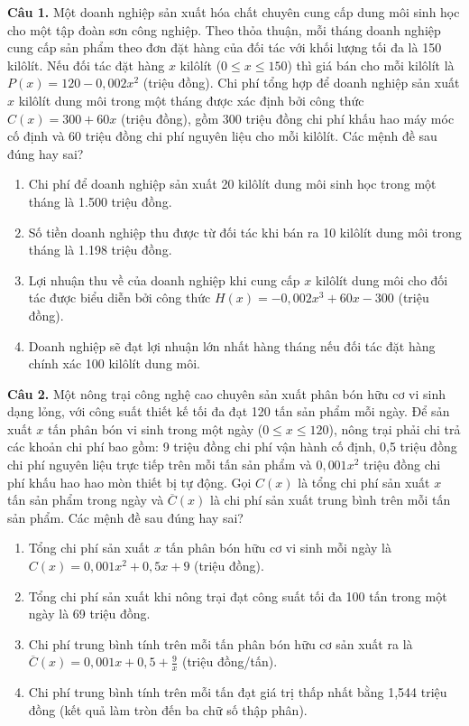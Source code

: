 \documentclass[12pt]{article}
\begin{document}
	\noindent \textbf{Câu 1.} Một doanh nghiệp sản xuất hóa chất chuyên cung cấp dung môi sinh học cho một tập đoàn sơn công nghiệp. Theo thỏa thuận, mỗi tháng doanh nghiệp cung cấp sản phẩm theo đơn đặt hàng của đối tác với khối lượng tối đa là 150 kilôlít. Nếu đối tác đặt hàng $x$ kilôlít ($0 \le x \le 150$) thì giá bán cho mỗi kilôlít là $P(x) = 120 - 0,002x^2$ (triệu đồng). Chi phí tổng hợp để doanh nghiệp sản xuất $x$ kilôlít dung môi trong một tháng được xác định bởi công thức $C(x) = 300 + 60x$ (triệu đồng), gồm 300 triệu đồng chi phí khấu hao máy móc cố định và 60 triệu đồng chi phí nguyên liệu cho mỗi kilôlít. Các mệnh đề sau đúng hay sai?
	\begin{enumerate}[label=\textbf{\alph*)}]
		\item Chi phí để doanh nghiệp sản xuất 20 kilôlít dung môi sinh học trong một tháng là 1.500 triệu đồng. \hfill  
		\item Số tiền doanh nghiệp thu được từ đối tác khi bán ra 10 kilôlít dung môi trong tháng là 1.198 triệu đồng. \hfill  
		\item Lợi nhuận thu về của doanh nghiệp khi cung cấp $x$ kilôlít dung môi cho đối tác được biểu diễn bởi công thức $H(x) = -0,002x^3 + 60x - 300$ (triệu đồng). \hfill  
		\item Doanh nghiệp sẽ đạt lợi nhuận lớn nhất hàng tháng nếu đối tác đặt hàng chính xác 100 kilôlít dung môi. \hfill  
	\end{enumerate}
	
	\vspace{0.6cm}
	\noindent \textbf{Câu 2.} Một nông trại công nghệ cao chuyên sản xuất phân bón hữu cơ vi sinh dạng lỏng, với công suất thiết kế tối đa đạt 120 tấn sản phẩm mỗi ngày. Để sản xuất $x$ tấn phân bón vi sinh trong một ngày ($0 \le x \le 120$), nông trại phải chi trả các khoản chi phí bao gồm: 9 triệu đồng chi phí vận hành cố định, 0,5 triệu đồng chi phí nguyên liệu trực tiếp trên mỗi tấn sản phẩm và $0,001x^2$ triệu đồng chi phí khấu hao hao mòn thiết bị tự động. Gọi $C(x)$ là tổng chi phí sản xuất $x$ tấn sản phẩm trong ngày và $\overline{C}(x)$ là chi phí sản xuất trung bình trên mỗi tấn sản phẩm. Các mệnh đề sau đúng hay sai?
	\begin{enumerate}[label=\textbf{\alph*)}]
		\item Tổng chi phí sản xuất $x$ tấn phân bón hữu cơ vi sinh mỗi ngày là $C(x) = 0,001x^2 + 0,5x + 9$ (triệu đồng). \hfill  
		\item Tổng chi phí sản xuất khi nông trại đạt công suất tối đa 100 tấn trong một ngày là 69 triệu đồng. \hfill  
		\item Chi phí trung bình tính trên mỗi tấn phân bón hữu cơ sản xuất ra là $\overline{C}(x) = 0,001x + 0,5 + \frac{9}{x}$ (triệu đồng/tấn). \hfill  
		\item Chi phí trung bình tính trên mỗi tấn đạt giá trị thấp nhất bằng 1,544 triệu đồng (kết quả làm tròn đến ba chữ số thập phân). \hfill  
	\end{enumerate}
	
\end{document}
